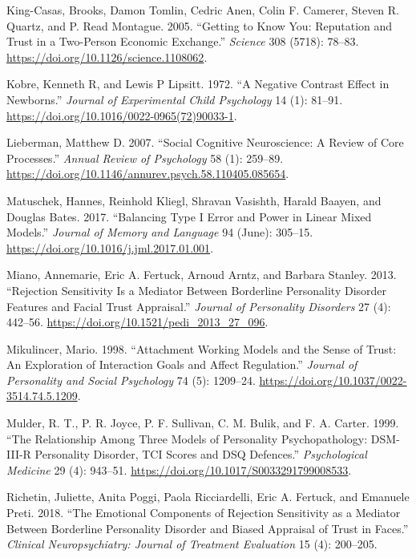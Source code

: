 \documentclass[
]{article}
\newlength{\cslhangindent}
\newenvironment{CSLReferences}[2] %
 {\begin{list}{}{%
  \setlength{\itemindent}{0pt}
  \setlength{\leftmargin}{0pt}
  \setlength{\parsep}{0pt}
  \ifodd #1
   \setlength{\leftmargin}{\cslhangindent}
   \setlength{\itemindent}{-1\cslhangindent}
  \fi
  \setlength{\itemsep}{#2\baselineskip}}}
 {\end{list}}
\begin{document}
\begin{CSLReferences}{1}{0}
King-Casas, Brooks, Damon Tomlin, Cedric Anen, Colin F. Camerer, Steven R. Quartz, and P. Read Montague. 2005. {``Getting to {Know You}: {Reputation} and {Trust} in a {Two-Person Economic Exchange}.''} \emph{Science} 308 (5718): 78--83. \url{https://doi.org/10.1126/science.1108062}.

Kobre, Kenneth R, and Lewis P Lipsitt. 1972. {``A Negative Contrast Effect in Newborns.''} \emph{Journal of Experimental Child Psychology} 14 (1): 81--91. \url{https://doi.org/10.1016/0022-0965(72)90033-1}.

Lieberman, Matthew D. 2007. {``Social {Cognitive Neuroscience}: {A Review} of {Core Processes}.''} \emph{Annual Review of Psychology} 58 (1): 259--89. \url{https://doi.org/10.1146/annurev.psych.58.110405.085654}.

Matuschek, Hannes, Reinhold Kliegl, Shravan Vasishth, Harald Baayen, and Douglas Bates. 2017. {``Balancing {Type I} Error and Power in Linear Mixed Models.''} \emph{Journal of Memory and Language} 94 (June): 305--15. \url{https://doi.org/10.1016/j.jml.2017.01.001}.

Miano, Annemarie, Eric A. Fertuck, Arnoud Arntz, and Barbara Stanley. 2013. {``Rejection {Sensitivity Is} a {Mediator Between Borderline Personality Disorder Features} and {Facial Trust Appraisal}.''} \emph{Journal of Personality Disorders} 27 (4): 442--56. \url{https://doi.org/10.1521/pedi_2013_27_096}.

Mikulincer, Mario. 1998. {``Attachment Working Models and the Sense of Trust: {An} Exploration of Interaction Goals and Affect Regulation.''} \emph{Journal of Personality and Social Psychology} 74 (5): 1209--24. \url{https://doi.org/10.1037/0022-3514.74.5.1209}.

Mulder, R. T., P. R. Joyce, P. F. Sullivan, C. M. Bulik, and F. A. Carter. 1999. {``The Relationship Among Three Models of Personality Psychopathology: {DSM-III-R} Personality Disorder, {TCI} Scores and {DSQ} Defences.''} \emph{Psychological Medicine} 29 (4): 943--51. \url{https://doi.org/10.1017/S0033291799008533}.

Richetin, Juliette, Anita Poggi, Paola Ricciardelli, Eric A. Fertuck, and Emanuele Preti. 2018. {``The Emotional Components of Rejection Sensitivity as a Mediator Between {Borderline Personality Disorder} and Biased Appraisal of Trust in Faces.''} \emph{Clinical Neuropsychiatry: Journal of Treatment Evaluation} 15 (4): 200--205.


\end{CSLReferences}
\end{document}
